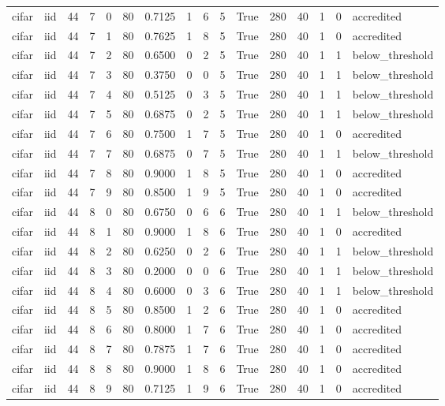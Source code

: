 \begin{tabular}{llrrrrrrrrrrrrrl}
cifar & iid & 44 & 7 & 0 & 80 & 0.7125 & 1 & 6 & 5 & True & 280 & 40 & 1 & 0 & accredited \\
cifar & iid & 44 & 7 & 1 & 80 & 0.7625 & 1 & 8 & 5 & True & 280 & 40 & 1 & 0 & accredited \\
cifar & iid & 44 & 7 & 2 & 80 & 0.6500 & 0 & 2 & 5 & True & 280 & 40 & 1 & 1 & below\_threshold \\
cifar & iid & 44 & 7 & 3 & 80 & 0.3750 & 0 & 0 & 5 & True & 280 & 40 & 1 & 1 & below\_threshold \\
cifar & iid & 44 & 7 & 4 & 80 & 0.5125 & 0 & 3 & 5 & True & 280 & 40 & 1 & 1 & below\_threshold \\
cifar & iid & 44 & 7 & 5 & 80 & 0.6875 & 0 & 2 & 5 & True & 280 & 40 & 1 & 1 & below\_threshold \\
cifar & iid & 44 & 7 & 6 & 80 & 0.7500 & 1 & 7 & 5 & True & 280 & 40 & 1 & 0 & accredited \\
cifar & iid & 44 & 7 & 7 & 80 & 0.6875 & 0 & 7 & 5 & True & 280 & 40 & 1 & 1 & below\_threshold \\
cifar & iid & 44 & 7 & 8 & 80 & 0.9000 & 1 & 8 & 5 & True & 280 & 40 & 1 & 0 & accredited \\
cifar & iid & 44 & 7 & 9 & 80 & 0.8500 & 1 & 9 & 5 & True & 280 & 40 & 1 & 0 & accredited \\
cifar & iid & 44 & 8 & 0 & 80 & 0.6750 & 0 & 6 & 6 & True & 280 & 40 & 1 & 1 & below\_threshold \\
cifar & iid & 44 & 8 & 1 & 80 & 0.9000 & 1 & 8 & 6 & True & 280 & 40 & 1 & 0 & accredited \\
cifar & iid & 44 & 8 & 2 & 80 & 0.6250 & 0 & 2 & 6 & True & 280 & 40 & 1 & 1 & below\_threshold \\
cifar & iid & 44 & 8 & 3 & 80 & 0.2000 & 0 & 0 & 6 & True & 280 & 40 & 1 & 1 & below\_threshold \\
cifar & iid & 44 & 8 & 4 & 80 & 0.6000 & 0 & 3 & 6 & True & 280 & 40 & 1 & 1 & below\_threshold \\
cifar & iid & 44 & 8 & 5 & 80 & 0.8500 & 1 & 2 & 6 & True & 280 & 40 & 1 & 0 & accredited \\
cifar & iid & 44 & 8 & 6 & 80 & 0.8000 & 1 & 7 & 6 & True & 280 & 40 & 1 & 0 & accredited \\
cifar & iid & 44 & 8 & 7 & 80 & 0.7875 & 1 & 7 & 6 & True & 280 & 40 & 1 & 0 & accredited \\
cifar & iid & 44 & 8 & 8 & 80 & 0.9000 & 1 & 8 & 6 & True & 280 & 40 & 1 & 0 & accredited \\
cifar & iid & 44 & 8 & 9 & 80 & 0.7125 & 1 & 9 & 6 & True & 280 & 40 & 1 & 0 & accredited \\

\end{tabular}
